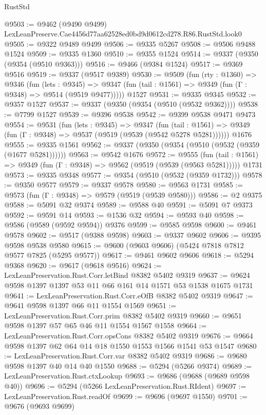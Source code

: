 \begin{lexlean}{RustStd}
\begin{coremodule}
@9503 := @9462 (@9490 @9499) LexLeanPreserve.Cae4456d77aa62528ed0bd9d0612cd278.R86.RustStd.look0
@9505 := @9322 @9489 @9499
@9506 := @9335 @5267
@9508 := @9506 @9488 @1524
@9509 := @9335 @1360
@9510 := @9355 @1524
@9514 := @9337 (@9350 (@9354 (@9510 @9363)))
@9516 := @9466 (@9384 @1524)
@9517 := @9369 @9516
@9519 := @9337 (@9517 @9389)
@9530 := @9509
    (fun (rty : @1360) =>
    @9346
      (fun (lets : @9345) =>
      @9347 (fun (tail : @1561) => @9349 (fun (Γ : @9348) => @9514 (@9519 @9477)))))
    @1527
@9531 := @9335 @9345
@9532 := @9357 @1527
@9537 := @9337 (@9350 (@9354 (@9510 (@9532 @9362))))
@9538 := @7799 @1527
@9539 := @9396 @9538
@9542 := @9399 @9538 @9471 @9473
@9554 := @9531
    (fun (lets : @9345) =>
    @9347
      (fun (tail : @1561) => @9349 (fun (Γ : @9348) => @9537 (@9519 (@9539 (@9542 @5278 @5281))))))
    @1676
@9555 := @9335 @1561
@9562 := @9337 (@9350 (@9354 (@9510 (@9532 (@9359 (@1677 @5281))))))
@9563 := @9542 @1676
@9572 := @9555
    (fun (tail : @1561) => @9349 (fun (Γ : @9348) => @9562 (@9519 (@9539 (@9563 @5281)))))
    @1731
@9573 := @9335 @9348
@9577 := @9354 (@9510 (@9532 (@9359 @1732)))
@9578 := @9350 @9577
@9579 := @9337 @9578
@9580 := @9563 @1731
@9585 := @9573 (fun (Γ : @9348) => @9579 (@9519 (@9539 @9580)))
@9586 := @2 @9375
@9588 := @5091 @32 @9374
@9589 := @9588 @40
@9591 := @5091 @7 @9373
@9592 := @9591 @14
@9593 := @1536 @32
@9594 := @9593 @40
@9598 := @9586 (@9589 (@9592 @9594)) @9376
@9599 := @9585 @9598
@9600 := @9461 @9578
@9602 := @9517 (@9388 @9598)
@9603 := @9337 @9602
@9606 := @9395 @9598 @9538 @9580
@9615 := @9600 (@9603 @9606) (@5424 @7818 @7812 @9577 @7825 (@5295 @9577))
@9617 := @9461 @9602 @9606
@9618 := @5294 @9368
@9620 := @9617 (@9618 @9516)
@9624 := LexLeanPreservation.Rust.Corr.letBind @8382 @5402 @9319
@9637 := @9624 @9598 @1397 @1397 @53 @11 @66 @161 @14 @1571 @53 @1538 @1675 @1731
@9641 := LexLeanPreservation.Rust.Corr.eOfB @8382 @5402 @9319
@9647 := @9641 @9598 @1397 @66 @11 @1554 @1569
@9651 := LexLeanPreservation.Rust.Corr.prim @8382 @5402 @9319
@9660 := @9651 @9598 @1397 @57 @65 @46 @11 @1554 @1567 @1558
@9664 := LexLeanPreservation.Rust.Corr.opsCons @8382 @5402 @9319
@9676 := @9664 @9598 @1397 @62 @64 @14 @18 @1550 @1553 @1566 @1541 @53 @1547
@9680 := LexLeanPreservation.Rust.Corr.var @8382 @5402 @9319
@9686 := @9680 @9598 @1397 @40 @14 @40 @1550
@9688 := @5294 (@5266 @9374)
@9689 := LexLeanPreservation.Rust.ctxLookup
@9693 := @9686 (@9688 (@9689 @9598 @40))
@9696 := @5294 (@5266 LexLeanPreservation.Rust.RIdent)
@9697 := LexLeanPreservation.Rust.readOf
@9699 := @9696 (@9697 @1550)
@9701 := @9676 (@9693 @9699)

\end{coremodule}
\end{lexlean}
